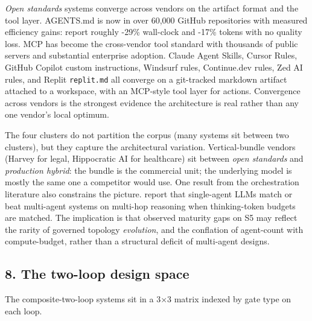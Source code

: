 \emph{Open standards} systems converge across vendors on the artifact
format and the tool layer. AGENTS.md is now in over 60,000 GitHub
repositories with measured efficiency gains: \citet{lulla2026empirical}
report roughly -29\% wall-clock and -17\% tokens with no quality loss. MCP
has become the cross-vendor tool standard with thousands of public
servers and substantial enterprise adoption. Claude Agent Skills, Cursor
Rules, GitHub Copilot custom instructions, Windsurf rules, Continue.dev
rules, Zed AI rules, and Replit \texttt{replit.md} all converge on a
git-tracked markdown artifact attached to a workspace, with an MCP-style
tool layer for actions. Convergence across vendors is the strongest
evidence the architecture is real rather than any one vendor's local
optimum.

The four clusters do not partition the corpus (many systems sit between
two clusters), but they capture the architectural variation.
Vertical-bundle vendors (Harvey for legal, Hippocratic AI for
healthcare) sit between \emph{open standards} and \emph{production
hybrid}: the bundle is the commercial unit; the underlying model is
mostly the same one a competitor would use. One result from the
orchestration literature also constrains the picture.
\citet{tran2026singleagent} report that single-agent LLMs match or beat
multi-agent systems on multi-hop reasoning when thinking-token budgets
are matched. The implication is that observed maturity gaps on S5 may
reflect the rarity of governed topology \emph{evolution}, and the
conflation of agent-count with compute-budget, rather than a structural
deficit of multi-agent designs.

\subsection{8. The two-loop design
space}\label{the-two-loop-design-space}

The composite-two-loop systems sit in a 3×3 matrix indexed by gate type
on each loop.

